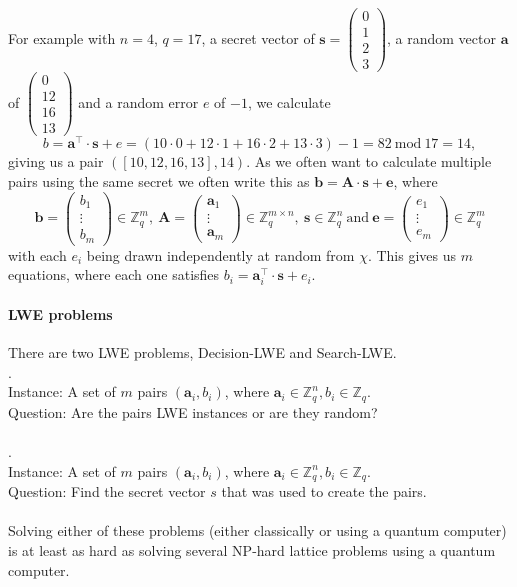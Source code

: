 \documentclass[a4paper, 11pt, openany]{book}
\begin{document}
For example with $n = 4$, $q = 17$, a secret vector of $\textbf{s} = \begin{pmatrix}0\\1\\2\\3\end{pmatrix}$, a random vector $\textbf{a}$ of $\begin{pmatrix}0\\12\\16\\13\end{pmatrix}$ and a random error $e$ of $-1$, we calculate
\[
    b = \textbf{a}^{\top}\cdot\textbf{s} + e = (10\cdot0 +12\cdot1 +16\cdot2 +13\cdot3) - 1 = 82 ~\text{mod}~ 17 = 14,
\]
giving us a pair $([10,12,16,13],14)$.
As we often want to calculate multiple pairs using the same secret we often write this as $\textbf{b} = \textbf{A}\cdot \textbf{s} + \textbf{e}$, where $$\textbf{b} = \begin{pmatrix}b_{1}\\ \vdots\\  b_{m}\end{pmatrix}\in \mathbb{Z}_{q}^{m},~ \textbf{A} = \begin{pmatrix}\textbf{a}_{1} \\ \vdots \\ \textbf{a}_{m}\end{pmatrix} \in \mathbb{Z}_{q}^{m \times n},~ \textbf{s} \in \mathbb{Z}_{q}^{n} ~\text{and}~ \textbf{e} =\begin{pmatrix}e_{1}\\ \vdots\\  e_{m}\end{pmatrix} \in \mathbb{Z}_{q}^{m}$$ with each $e_{i}$ being drawn independently at random from $\chi$. This gives us $m$ equations, where each one satisfies $b_{i} =  \textbf{a}_{i}^{\top}\cdot\textbf{s} + e_{i}$.


\paragraph{LWE problems} There are two LWE problems, Decision-LWE and Search-LWE.
\\
.
\\
Instance: A set of $m$ pairs $(\textbf{a}_{i},b_{i})$, where $\textbf{a}_{i} \in \mathbb{Z}_{q}^{n}, b_{i} \in \mathbb{Z}_{q}$.
\\
Question: Are the pairs LWE instances or are they random?
\\
~\\
.
\\
Instance: A set of $m$ pairs $(\textbf{a}_{i},b_{i})$, where $\textbf{a}_{i} \in \mathbb{Z}_{q}^{n}, b_{i} \in \mathbb{Z}_{q}$.
\\
Question: Find the secret vector $s$ that was used to create the pairs.
\\
~\\
Solving either of these problems (either classically or using a quantum computer) is at least as hard as solving several NP-hard lattice problems using a quantum computer.
\end{document}
